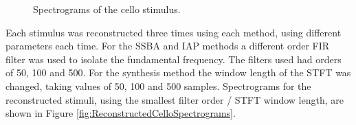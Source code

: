 		\begin{figure}[h!]
			\centering
			\quad
			\caption{Spectrograms of the cello stimulus.}
			\label{fig:CelloSpectrograms}
		\end{figure}

		Each stimulus was reconstructed three times using each method, using different parameters each time. For the
		SSBA and IAP methods a different order FIR filter was used to isolate the fundamental frequency. The filters
		used had orders of 50, 100 and 500. For the synthesis method the window length of the STFT was changed,
		taking values of 50, 100 and 500 samples. Spectrograms for the reconstructed stimuli, using the smallest
		filter order / STFT window length, are shown in Figure \ref{fig:ReconstructedCelloSpectrograms}.

